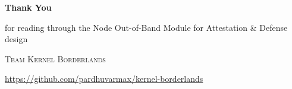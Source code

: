 \documentclass[11pt,a4paper]{article}
\begin{document}
\clearpage
\thispagestyle{empty}
\begin{center}
\vspace*{\fill}

{\small{}}

\vspace{1.4cm}

{\fontsize{22}{26}\selectfont\bfseries Thank You}

\vspace{0.6em}

{\normalsize for reading through the Node Out-of-Band Module for Attestation \& Defense design}

\vspace{1.8cm}

{\small \scshape Team Kernel Borderlands}

\vspace{0.9em}

{\small \url{https://github.com/pardhuvarmax/kernel-borderlands}}

\vspace*{\fill}
\end{center}
\end{document}
